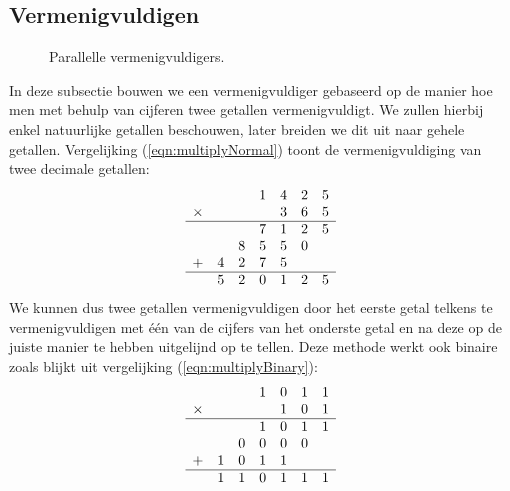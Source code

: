 \subsection{Vermenigvuldigen}
\begin{figure}[htb]
\centering
{}
\caption{Parallelle vermenigvuldigers.}
\end{figure}
In deze subsectie bouwen we een vermenigvuldiger gebaseerd op de manier hoe men met behulp van cijferen twee getallen vermenigvuldigt. We zullen hierbij enkel natuurlijke getallen beschouwen, later breiden we dit uit naar gehele getallen. Vergelijking (\ref{eqn:multiplyNormal}) toont de vermenigvuldiging van twee decimale getallen:
\begin{equation}
\begin{array}{lcccccc}
&&&1&4&2&5\\
\times&&&&3&6&5\\\hline
&&&7&1&2&5\\
&&8&5&5&0&\\
+&4&2&7&5&&\\\hline
&5&2&0&1&2&5
\end{array}
\label{eqn:multiplyNormal}
\end{equation}
We kunnen dus twee getallen vermenigvuldigen door het eerste getal telkens te vermenigvuldigen met \'e\'en van de cijfers van het onderste getal en na deze op de juiste manier te hebben uitgelijnd op te tellen. Deze methode werkt ook binaire zoals blijkt uit vergelijking (\ref{eqn:multiplyBinary}):
\begin{equation}
\begin{array}{lcccccc}
&&&1&0&1&1\\
\times&&&&1&0&1\\\hline
&&&1&0&1&1\\
&&0&0&0&0&\\
+&1&0&1&1&&\\\hline
&1&1&0&1&1&1
\end{array}
\label{eqn:multiplyBinary}
\end{equation}

